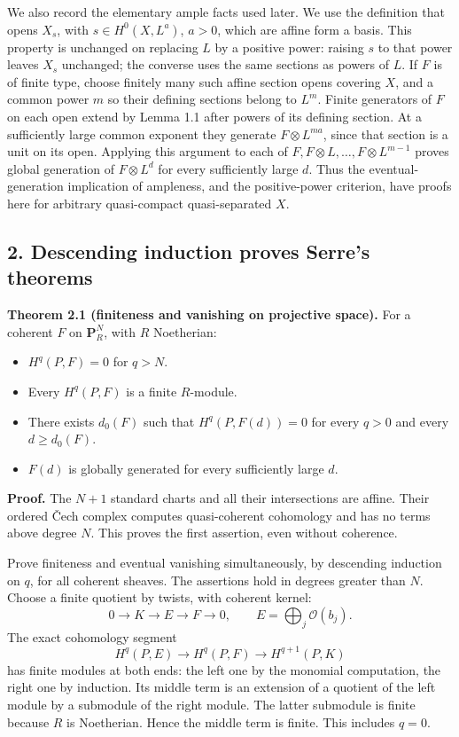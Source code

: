 \documentclass[11pt]{article}
\providecommand{\tightlist}{\setlength{\itemsep}{0pt}\setlength{\parskip}{0pt}}
\begin{document}
We also record the elementary ample facts used later. We use the
definition that opens \(X_s\), with \(s\in H^0(X,L^a)\), \(a>0\), which
are affine form a basis. This property is unchanged on replacing \(L\)
by a positive power: raising \(s\) to that power leaves \(X_s\)
unchanged; the converse uses the same sections as powers of \(L\). If
\(F\) is of finite type, choose finitely many such affine section opens
covering \(X\), and a common power \(m\) so their defining sections
belong to \(L^m\). Finite generators of \(F\) on each open extend by
Lemma 1.1 after powers of its defining section. At a sufficiently large
common exponent they generate \(F\otimes L^{ma}\), since that section is
a unit on its open. Applying this argument to each of
\(F,F\otimes L,\ldots,F\otimes L^{m-1}\) proves global generation of
\(F\otimes L^d\) for every sufficiently large \(d\). Thus the
eventual-generation implication of ampleness, and the positive-power
criterion, have proofs here for arbitrary quasi-compact quasi-separated
\(X\).

\subsection{2. Descending induction proves Serre's
theorems}\label{descending-induction-proves-serres-theorems}

\textbf{Theorem 2.1 (finiteness and vanishing on projective space).} For
a coherent \(F\) on \(\mathbf P_R^N\), with \(R\) Noetherian:

\begin{itemize}
\tightlist
\item
  \(H^q(P,F)=0\) for \(q>N\).
\item
  Every \(H^q(P,F)\) is a finite \(R\)-module.
\item
  There exists \(d_0(F)\) such that \(H^q(P,F(d))=0\) for every \(q>0\)
  and every \(d\ge d_0(F)\).
\item
  \(F(d)\) is globally generated for every sufficiently large \(d\).
\end{itemize}

\textbf{Proof.} The \(N+1\) standard charts and all their intersections
are affine. Their ordered Čech complex computes quasi-coherent
cohomology and has no terms above degree \(N\). This proves the first
assertion, even without coherence.

Prove finiteness and eventual vanishing simultaneously, by descending
induction on \(q\), for all coherent sheaves. The assertions hold in
degrees greater than \(N\). Choose a finite quotient by twists, with
coherent kernel: \[
0\longrightarrow K\longrightarrow E\longrightarrow F\longrightarrow0,
\qquad E=\bigoplus_j\mathcal O(b_j).
\] The exact cohomology segment \[
H^q(P,E)\longrightarrow H^q(P,F)\longrightarrow H^{q+1}(P,K)
\] has finite modules at both ends: the left one by the monomial
computation, the right one by induction. Its middle term is an extension
of a quotient of the left module by a submodule of the right module. The
latter submodule is finite because \(R\) is Noetherian. Hence the middle
term is finite. This includes \(q=0\).
\end{document}
